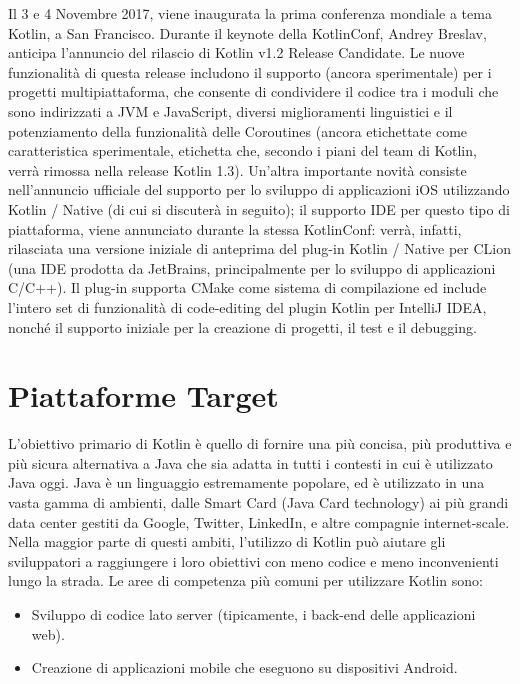 Il 3 e 4 Novembre 2017, viene inaugurata la prima conferenza mondiale a tema Kotlin, a San Francisco. Durante il keynote \cite{kotlinKeynoteRecap} della KotlinConf, Andrey Breslav, anticipa l’annuncio del rilascio di Kotlin v1.2 Release Candidate. Le nuove funzionalità di questa release includono il supporto (ancora sperimentale) per i progetti multipiattaforma, che consente di condividere il codice tra i moduli che sono indirizzati a JVM e JavaScript, diversi miglioramenti linguistici e il potenziamento della funzionalità delle Coroutines (ancora etichettate come caratteristica sperimentale, etichetta che, secondo i piani del team di Kotlin, verrà rimossa nella release Kotlin 1.3). Un'altra importante novità consiste nell'annuncio ufficiale del supporto per lo sviluppo di applicazioni iOS utilizzando Kotlin / Native \cite{kotlinNativeIDESupport} (di cui si discuterà in seguito); il supporto IDE per questo tipo di piattaforma, viene annunciato durante la stessa KotlinConf: verrà, infatti, rilasciata una versione iniziale di anteprima del plug-in Kotlin / Native per CLion (una IDE prodotta da JetBrains, principalmente per lo sviluppo di applicazioni C/C++). Il plug-in supporta CMake come sistema di compilazione ed include l'intero set di funzionalità di code-editing del plugin Kotlin per IntelliJ IDEA, nonché il supporto iniziale per la creazione di progetti, il test e il debugging.\\

\section{Piattaforme Target}

L'obiettivo primario di Kotlin è quello di fornire una più concisa, più produttiva e più sicura alternativa a Java che sia adatta in tutti i contesti in cui è utilizzato Java oggi. Java è un linguaggio estremamente popolare, ed è utilizzato in una vasta gamma di ambienti, dalle Smart Card (Java Card technology) ai più grandi data center gestiti da Google, Twitter, LinkedIn, e altre compagnie internet-scale. Nella maggior parte di questi ambiti, l'utilizzo di Kotlin può aiutare gli sviluppatori a raggiungere i loro obiettivi con meno codice e meno inconvenienti lungo la strada. Le aree di competenza più comuni per utilizzare Kotlin sono:
\begin{itemize}
  \item Sviluppo di codice lato server (tipicamente, i back-end delle applicazioni web).
  \item Creazione di applicazioni mobile che eseguono su dispositivi Android.
\end{itemize}

